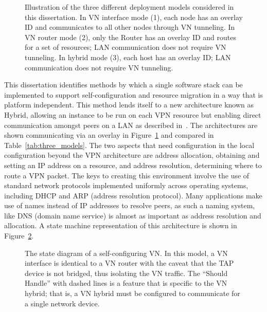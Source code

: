 \begin{figure}
\centering
{}

\caption[Three VN Approaches]{Illustration of the three different deployment
models considered in this dissertation. In VN interface mode (1), each node has
an overlay ID and communicates to all other nodes through VN tunneling. In VN
router mode (2), only the Router has an overlay ID and routes for a set of
resources; LAN communication does not require VN tunneling. In hybrid mode (3),
each host has an overlay ID; LAN communication does not require VN tunneling.}

\label{fig:three_models}
\end{figure}

This dissertation identifies methods by which a single software stack can be
implemented to support self-configuration and resource migration in a way that
is platform independent.  This method lends itself to a new architecture known
as Hybrid, allowing an instance to be run on each VPN resource but enabling
direct communication amongst peers on a LAN as described in~\cite{sc09}.  The
architectures are shown communicating via an overlay in
Figure~\ref{fig:three_models} and compared in Table~\ref{tab:three_models}.
The two aspects that need configuration in the local configuration beyond the
VPN architecture are address allocation, obtaining and setting an IP address on
a resource, and address resolution, determining where to route a VPN packet.
The keys to creating this environment involve the use of standard network
protocols implemented uniformly across operating systems, including DHCP and
ARP (address resolution protocol).  Many applications make use of names instead
of IP addresses to resolve peers, as such a naming system, like DNS (domain
name service) is almost as important as address resolution and allocation.  A
state machine representation of this architecture is shown in
Figure~\ref{fig:vn}.

\begin{figure}[ht]
\centering
{}
\caption[The state diagram of a self-configuring VN.]{The state diagram of a
self-configuring VN.  In this model, a VN interface is identical to a VN router
with the caveat that the TAP device is not bridged, thus isolating the VN
traffic.  The ``Should Handle'' with dashed lines is a feature that is specific
to the VN hybrid; that is, a VN hybrid must be configured to communicate for a
single network device.}
\label{fig:vn}
\end{figure}

